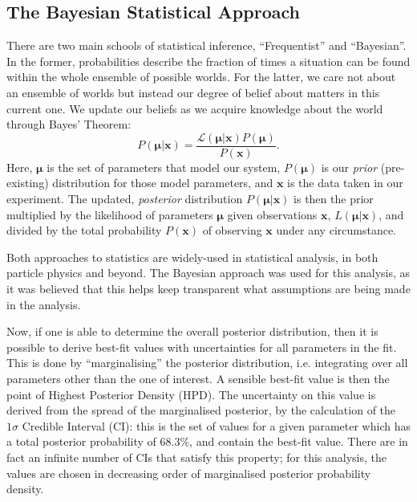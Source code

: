 \subsection{The Bayesian Statistical Approach}
There are two main schools of statistical inference, ``Frequentist'' and ``Bayesian''. In the former, probabilities describe the fraction of times a situation can be found within the whole ensemble of possible worlds. For the latter, we care not about an ensemble of worlds but instead our degree of belief about matters in this current one. We update our beliefs as we acquire knowledge about the world through Bayes' Theorem:
\begin{equation}
    P\left(\bm{\mu}|\bm{x}\right) = \frac{\mathcal{L}\left(\bm{\mu}|\bm{x}\right)P\left(\bm{\mu}\right)}{P\left(\bm{x}\right)}.
\end{equation}
Here, $\bm{\mu}$ is the set of parameters that model our system, $P\left(\bm{\mu}\right)$ is our \textit{prior} (pre-existing) distribution for those model parameters, and $\bm{x}$ is the data taken in our experiment. The updated, \textit{posterior} distribution $P\left(\bm{\mu}|\bm{x}\right)$ is then the prior multiplied by the likelihood of parameters $\bm{\mu}$ given observations $\bm{x}$, $L\left(\bm{\mu}|\bm{x}\right)$, and divided by the total probability $P\left(\bm{x}\right)$ of observing $\bm{x}$ under any circumstance.

Both approaches to statistics are widely-used in statistical analysis, in both particle physics and beyond. The Bayesian approach was used for this analysis, as it was believed that this helps keep transparent what assumptions are being made in the analysis. 

Now, if one is able to determine the overall posterior distribution, then it is possible to derive best-fit values with uncertainties for all parameters in the fit. This is done by ``marginalising'' the posterior distribution, i.e. integrating over all parameters other than the one of interest. A sensible best-fit value is then the point of Highest Posterior Density (HPD). The uncertainty on this value is derived from the spread of the marginalised posterior, by the calculation of the $1\sigma$ Credible Interval (CI): this is the set of values for a given parameter which has a total posterior probability of 68.3\%, and contain the best-fit value. There are in fact an infinite number of CIs that satisfy this property; for this analysis, the values are chosen in decreasing order of marginalised posterior probability density.
